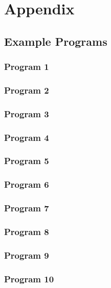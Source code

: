 \section{Appendix}

\subsection{Example Programs}

\subsubsection{Program 1}

\subsubsection{Program 2}

\subsubsection{Program 3}

\subsubsection{Program 4}

\subsubsection{Program 5}

\subsubsection{Program 6}

\subsubsection{Program 7}

\subsubsection{Program 8}

\subsubsection{Program 9}

\subsubsection{Program 10}

